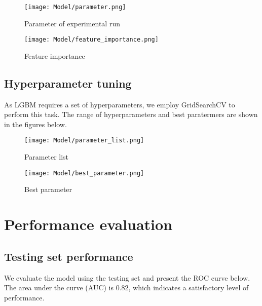 \documentclass{article}
\begin{document}
\begin{figure}[ht]
  \centering
  \begin{minipage}[b]{0.49\linewidth}
    \centering
    \texttt{[image: Model/parameter.png]} 
    \caption{Parameter of experimental run}
  \end{minipage}
  \hfill
  \begin{minipage}[b]{0.49\linewidth}
    \centering
    \texttt{[image: Model/feature\_importance.png]} 
    \caption{Feature importance}
  \end{minipage}
\end{figure}

\subsection{Hyperparameter tuning}

As LGBM requires a set of hyperparameters, we employ GridSearchCV to perform this task. The range of hyperparameters and best paratermers are shown in the figures below.

\begin{figure}[ht]
  \centering
  \begin{minipage}[b]{0.49\linewidth}
    \centering
    \texttt{[image: Model/parameter\_list.png]} 
    \caption{Parameter list}
  \end{minipage}
  \hfill
  \begin{minipage}[b]{0.49\linewidth}
    \centering
    \texttt{[image: Model/best\_parameter.png]} 
    \caption{Best parameter}
  \end{minipage}
\end{figure}


\section{Performance evaluation}

\subsection{Testing set performance}

We evaluate the model using the testing set and present the ROC curve below. The area under the curve (AUC) is 0.82, which indicates a satisfactory level of performance.
\end{document}
